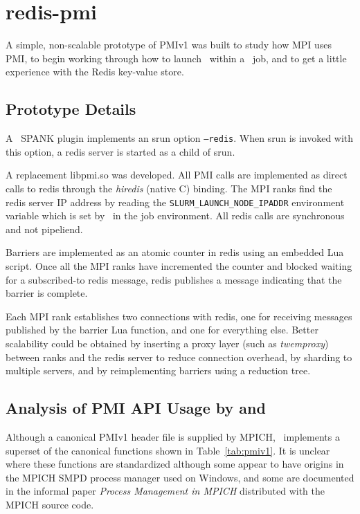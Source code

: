 \section{redis-pmi}

A simple, non-scalable prototype of PMIv1 was built to study
how MPI uses PMI, to begin working through how to launch \ngrm\ 
within a \slurm\ job, and to get a little experience with the Redis
key-value store.

\subsection{Prototype Details}

A \slurm\ SPANK plugin implements an srun option {\tt --redis}.
When srun is invoked with this option, a redis server is started
as a child of srun.

A replacement libpmi.so was developed.  All PMI calls are implemented
as direct calls to redis through the {\em hiredis} (native C) binding.
The MPI ranks find the redis server IP address by reading the
{\tt SLURM\_LAUNCH\_NODE\_IPADDR} environment variable which is set
by \slurm\ in the job environment.
All redis calls are synchronous and not pipeliend.

Barriers are implemented as an atomic counter in redis using an embedded
Lua script.
Once all the MPI ranks have incremented the counter and blocked waiting
for a subscribed-to redis message, redis publishes a message indicating
that the barrier is complete.

Each MPI rank establishes two connections with redis, one for receiving
messages published by the barrier Lua function, and one for everything else.
Better scalability could be obtained by inserting a proxy layer (such as
{\em twemproxy}) between ranks and the redis server to reduce connection
overhead, by sharding to multiple servers, and by reimplementing barriers
using a reduction tree.

\subsection{Analysis of PMI API Usage by  and \openmpi}

Although a canonical PMIv1 header file is supplied by MPICH,
\slurm\ implements a superset of the canonical functions shown in
Table~\ref{tab:pmiv1}.  It is unclear where these functions are
standardized although some appear to have origins in the MPICH
SMPD process manager used on Windows, and some are documented in
the informal paper {\em Process Management in MPICH} distributed
with the MPICH source code.

